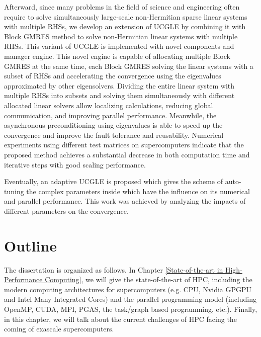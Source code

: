 Afterward, since many problems in the field of science and engineering often require to solve simultaneously large-scale non-Hermitian sparse linear systems with multiple RHSs, we develop an extension of UCGLE by combining it with Block GMRES method to solve non-Hermitian linear systems with multiple RHSs. This variant of UCGLE is implemented with novel components and manager engine. This novel engine is capable of allocating multiple Block GMRES at the same time, each Block GMRES solving the linear systems with a subset of RHSs and accelerating the convergence using the eigenvalues approximated by other eigensolvers. Dividing the entire linear system with multiple RHSs into subsets and solving them simultaneously with different allocated linear solvers allow localizing calculations, reducing global communication, and improving parallel performance. Meanwhile, the asynchronous preconditioning using eigenvalues is able to speed up the convergence and improve the fault tolerance and reusability. Numerical experiments using different test matrices on supercomputers indicate that the proposed method achieves a substantial decrease in both computation time and iterative steps with good scaling performance.

Eventually, an adaptive UCGLE is proposed which gives the scheme of auto-tuning the complex parameters inside which have the influence on its numerical and parallel performance. This work was achieved by analyzing the impacts of different parameters on the convergence.

\section{Outline}

The dissertation is organized as follows. In Chapter \ref{State-of-the-art in High-Performance Computing}, we will give the state-of-the-art of HPC, including the modern computing architectures for supercomputers (e.g. CPU, Nvidia GPGPU and Intel Many Integrated Cores) and the parallel programming model (including OpenMP, CUDA, MPI, PGAS, the task/graph based programming, etc.). Finally, in this chapter, we will talk about the current challenges of HPC facing the coming of exascale supercomputers.

